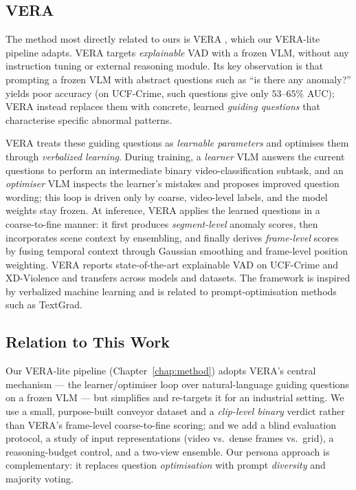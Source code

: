 \subsection{VERA}
The method most directly related to ours is VERA \cite{vera}, which our VERA-lite pipeline
adapts. VERA targets \emph{explainable} VAD with a frozen VLM, without any instruction
tuning or external reasoning module. Its key observation is that prompting a frozen VLM
with abstract questions such as ``is there any anomaly?'' yields poor accuracy (on
UCF-Crime, such questions give only $53$--$65\%$ AUC); VERA instead replaces them with
concrete, learned \emph{guiding questions} that characterise specific abnormal patterns.

VERA treats these guiding questions as \emph{learnable parameters} and optimises them
through \emph{verbalized learning}. During training, a \emph{learner} VLM answers the
current questions to perform an intermediate binary video-classification subtask, and an
\emph{optimiser} VLM inspects the learner's mistakes and proposes improved question
wording; this loop is driven only by coarse, video-level labels, and the model weights
stay frozen. At inference, VERA applies the learned questions in a coarse-to-fine manner:
it first produces \emph{segment-level} anomaly scores, then incorporates scene context by
ensembling, and finally derives \emph{frame-level} scores by fusing temporal context
through Gaussian smoothing and frame-level position weighting. VERA reports
state-of-the-art explainable VAD on UCF-Crime and XD-Violence and transfers across models
and datasets. The framework is inspired by verbalized machine learning and is related to
prompt-optimisation methods such as TextGrad.

\subsection{Relation to This Work}
Our VERA-lite pipeline (Chapter~\ref{chap:method}) adopts VERA's central mechanism --- the
learner/optimiser loop over natural-language guiding questions on a frozen VLM --- but
simplifies and re-targets it for an industrial setting. We use a small, purpose-built
conveyor dataset and a \emph{clip-level binary} verdict rather than VERA's frame-level
coarse-to-fine scoring; and we add a blind evaluation protocol, a study of input
representations (video vs.\ dense frames vs.\ grid), a reasoning-budget control, and a
two-view ensemble. Our persona approach is complementary: it replaces question
\emph{optimisation} with prompt \emph{diversity} and majority voting.

